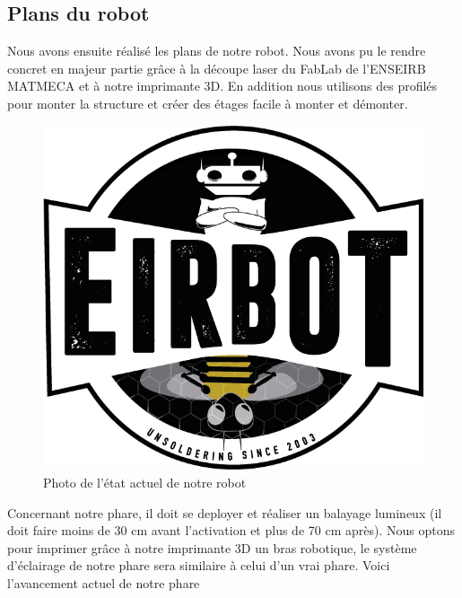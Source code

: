\documentclass[a4paper,10pt]{article}
\begin{document}
\begin{spacing}{1.5}
\subsection{Plans du robot}
Nous avons ensuite réalisé les plans de notre robot. Nous avons pu le rendre
concret en majeur partie grâce à la découpe laser du FabLab de l'ENSEIRB MATMECA
et à notre imprimante 3D. En addition nous utilisons des profilés pour monter la
structure et créer des étages facile à monter et démonter.
\begin{figure}[H]
  \center
  \includegraphics[scale=0.3]{LogoEirbot.png}
  \caption{Photo de l'état actuel de notre robot}
\end{figure}
Concernant notre phare, il doit se deployer et réaliser un balayage lumineux (il
doit faire moins de 30 cm avant l'activation et plus de 70 cm après). Nous optons
pour imprimer grâce à notre imprimante 3D un bras robotique, le système
d'éclairage de notre phare sera similaire à celui d'un vrai phare. Voici
l'avancement actuel de notre phare
\begin{figure}[H]
  \center

\end{figure}
\end{spacing}
\end{document}
